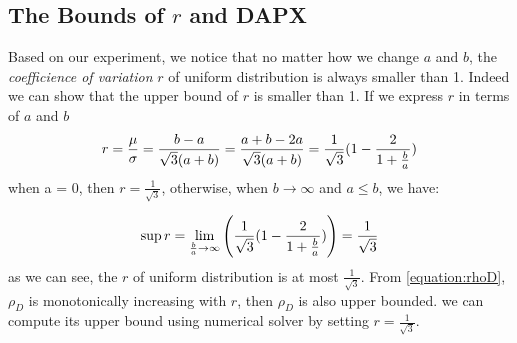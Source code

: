 \subsection{The Bounds of $r$ and DAPX}
Based on our experiment, we notice that no matter how we change $a$ and $b$, the \textit{coefficience of variation} $r$ of uniform distribution is always smaller than 1. Indeed we can show that the upper bound of $r$ is smaller than 1. If we express $r$ in terms of $a$ and $b$
\begin{equation}\notag
r = \frac{\mu}{\sigma} = \frac {b-a}{\sqrt{3}(a+b)} = \frac {a+b-2a}{\sqrt{3}(a+b)} = \frac {1}{\sqrt{3}} (1-  \frac {2}{1+\frac{b}{a}})
\end{equation} 
when a = 0, then $r = \frac {1}{\sqrt{3}}$, otherwise, when $b \rightarrow \infty$ and $a\leqslant b$, we have:

\begin{equation}\notag
\sup r = \displaystyle{\lim_{\frac{b}{a} \to \infty}}\left(\frac {1}{\sqrt{3}} (1-  \frac {2}{1+\frac{b}{a}})\right) = \frac {1}{\sqrt{3}}  
\end{equation} 
as we can see, the $r$ of uniform distribution is at most $\frac {1}{\sqrt{3}}$.
From \cref{equation:rhoD}, $\rho_D$ is monotonically increasing with $r$, then $\rho_D$ is also upper bounded. we can compute its upper bound using numerical solver by setting $r = \frac {1}{\sqrt{3}}$. 

